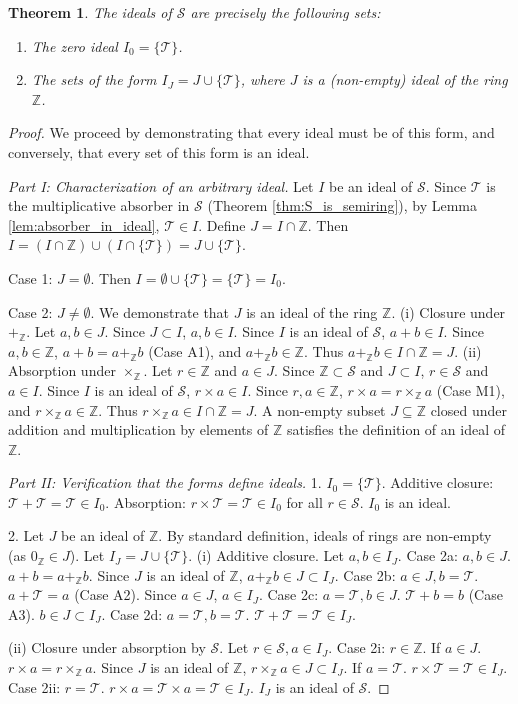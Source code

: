 \documentclass[11pt, a4paper]{article}
\theoremstyle{plain}
\newtheorem{theorem}{Theorem}[section]
\theoremstyle{definition}
\numberwithin{equation}{section}
\newcommand{\Z}{\mathbb{Z}}
\newcommand{\Tobj}{\mathcal{T}} %
\newcommand{\SemiringS}{\mathcal{S}}
\begin{document}
\begin{theorem}\label{thm:ideal_structure_S}
The ideals of $\SemiringS$ are precisely the following sets:
\begin{enumerate}
    \item The zero ideal $I_0 = \{\Tobj\}$.
    \item The sets of the form $I_J = J \cup \{\Tobj\}$, where $J$ is a (non-empty) ideal of the ring $\Z$.
\end{enumerate}
\end{theorem}
\begin{proof}
We proceed by demonstrating that every ideal must be of this form, and conversely, that every set of this form is an ideal.

\textit{Part I: Characterization of an arbitrary ideal.}
Let $I$ be an ideal of $\SemiringS$. Since $\Tobj$ is the multiplicative absorber in $\SemiringS$ (Theorem \ref{thm:S_is_semiring}), by Lemma \ref{lem:absorber_in_ideal}, $\Tobj \in I$.
Define $J = I \cap \Z$. Then $I = (I \cap \Z) \cup (I \cap \{\Tobj\}) = J \cup \{\Tobj\}$.

Case 1: $J = \emptyset$. Then $I = \emptyset \cup \{\Tobj\} = \{\Tobj\} = I_0$.

Case 2: $J \neq \emptyset$. We demonstrate that $J$ is an ideal of the ring $\Z$.
(i) Closure under $+_{\Z}$. Let $a, b \in J$. Since $J \subset I$, $a, b \in I$. Since $I$ is an ideal of $\SemiringS$, $a+b \in I$. Since $a, b \in \Z$, $a+b = a+_{\Z} b$ (Case A1), and $a+_{\Z} b \in \Z$. Thus $a+_{\Z}b \in I \cap \Z = J$.
(ii) Absorption under $\times_{\Z}$. Let $r \in \Z$ and $a \in J$. Since $\Z \subset \SemiringS$ and $J \subset I$, $r \in \SemiringS$ and $a \in I$. Since $I$ is an ideal of $\SemiringS$, $r\times a \in I$. Since $r, a \in \Z$, $r\times a = r\times_{\Z} a$ (Case M1), and $r\times_{\Z} a \in \Z$. Thus $r\times_{\Z} a \in I \cap \Z = J$.
A non-empty subset $J \subseteq \Z$ closed under addition and multiplication by elements of $\Z$ satisfies the definition of an ideal of $\Z$.

\textit{Part II: Verification that the forms define ideals.}
1. $I_0=\{\Tobj\}$.
Additive closure: $\Tobj+\Tobj=\Tobj \in I_0$.
Absorption: $r\times\Tobj = \Tobj \in I_0$ for all $r \in \SemiringS$. $I_0$ is an ideal.

2. Let $J$ be an ideal of $\Z$. By standard definition, ideals of rings are non-empty (as $0_{\Z} \in J$). Let $I_J = J \cup \{\Tobj\}$.
(i) Additive closure. Let $a, b \in I_J$.
Case 2a: $a, b \in J$. $a+b = a+_{\Z} b$. Since $J$ is an ideal of $\Z$, $a+_{\Z} b \in J \subset I_J$.
Case 2b: $a \in J, b=\Tobj$. $a+\Tobj = a$ (Case A2). Since $a \in J$, $a \in I_J$.
Case 2c: $a=\Tobj, b \in J$. $\Tobj+b = b$ (Case A3). $b \in J \subset I_J$.
Case 2d: $a=\Tobj, b=\Tobj$. $\Tobj+\Tobj = \Tobj \in I_J$.

(ii) Closure under absorption by $\SemiringS$. Let $r \in \SemiringS, a \in I_J$.
Case 2i: $r \in \Z$.
If $a \in J$. $r\times a = r\times_{\Z} a$. Since $J$ is an ideal of $\Z$, $r\times_{\Z} a \in J \subset I_J$.
If $a=\Tobj$. $r\times\Tobj = \Tobj \in I_J$.
Case 2ii: $r=\Tobj$.
$r\times a = \Tobj\times a = \Tobj \in I_J$.
$I_J$ is an ideal of $\SemiringS$.
\end{proof}
\end{document}
